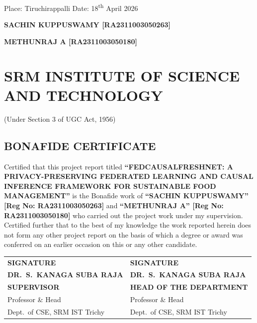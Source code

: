 \documentclass[12pt,a4paper]{report}
\begin{document}
\vspace{1.5cm}
\noindent Place: Tiruchirappalli \hfill Date: 18\textsuperscript{th} April 2026

\vspace{1.5cm}
\noindent\textbf{SACHIN KUPPUSWAMY [RA2311003050263]}

\vspace{1.5cm}
\noindent\textbf{METHUNRAJ A [RA2311003050180]}

\chapter*{SRM INSTITUTE OF SCIENCE AND TECHNOLOGY}
\begin{center}(Under Section 3 of UGC Act, 1956)\end{center}
\section*{BONAFIDE CERTIFICATE}

Certified that this project report titled \textbf{``FEDCAUSALFRESHNET: A PRIVACY-PRESERVING FEDERATED LEARNING AND CAUSAL INFERENCE FRAMEWORK FOR SUSTAINABLE FOOD MANAGEMENT''} is the Bonafide work of \textbf{``SACHIN KUPPUSWAMY'' [Reg No: RA2311003050263]} and \textbf{``METHUNRAJ A'' [Reg No: RA2311003050180]} who carried out the project work under my supervision. Certified further that to the best of my knowledge the work reported herein does not form any other project report on the basis of which a degree or award was conferred on an earlier occasion on this or any other candidate.

\vspace{2.5cm}
\noindent
\begin{tabular}{p{} p{}}
\textbf{SIGNATURE} & \textbf{SIGNATURE} \\[0.6cm]
\textbf{DR.\ S.\ KANAGA SUBA RAJA} & \textbf{DR.\ S.\ KANAGA SUBA RAJA} \\
\textbf{SUPERVISOR} & \textbf{HEAD OF THE DEPARTMENT} \\
Professor \& Head & Professor \& Head \\
Dept.\ of CSE, SRM IST Trichy & Dept.\ of CSE, SRM IST Trichy \\
\end{tabular}
\pagebreak
\end{document}
